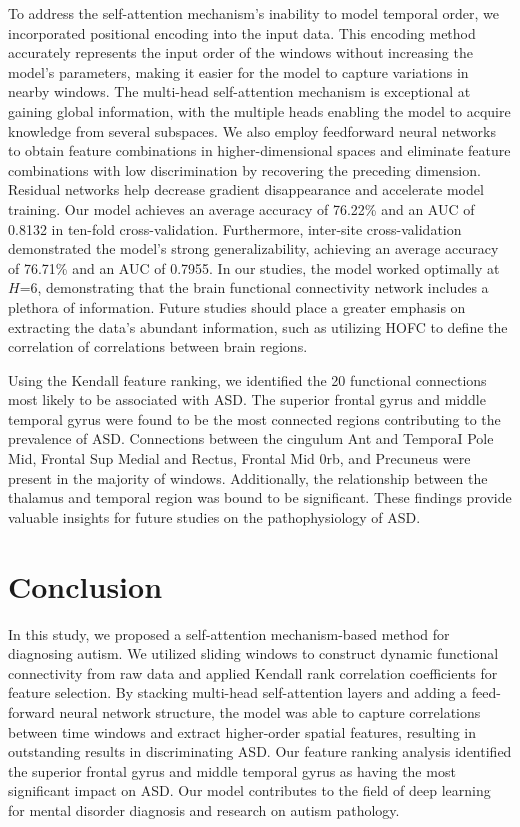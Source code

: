 \documentclass[a4paper]{cas-dc}
\begin{document}
To address the self-attention mechanism's inability to model temporal order, we incorporated positional encoding into the input data. This encoding method accurately represents the input order of the windows without increasing the model's parameters, making it easier for the model to capture variations in nearby windows. The multi-head self-attention mechanism is exceptional at gaining global information, with the multiple heads enabling the model to acquire knowledge from several subspaces. We also employ feedforward neural networks to obtain feature combinations in higher-dimensional spaces and eliminate feature combinations with low discrimination by recovering the preceding dimension. Residual networks help decrease gradient disappearance and accelerate model training. Our model achieves an average accuracy of 76.22\% and an AUC of 0.8132 in ten-fold cross-validation. Furthermore, inter-site cross-validation demonstrated the model's strong generalizability, achieving an average accuracy of 76.71\% and an AUC of 0.7955. In our studies, the model worked optimally at $H$=6, demonstrating that the brain functional connectivity network includes a plethora of information. Future studies should place a greater emphasis on extracting the data's abundant information, such as utilizing HOFC to define the correlation of correlations between brain regions.

Using the Kendall feature ranking, we identified the 20 functional connections most likely to be associated with ASD. The superior frontal gyrus and middle temporal gyrus were found to be the most connected regions contributing to the prevalence of ASD. Connections between the cingulum Ant and TemporaI Pole Mid, Frontal Sup Medial and Rectus, Frontal Mid 0rb, and Precuneus were present in the majority of windows. Additionally, the relationship between the thalamus and temporal region was bound to be significant. These findings provide valuable insights for future studies on the pathophysiology of ASD.
\section{Conclusion}
In this study, we proposed a self-attention mechanism-based method for diagnosing autism. We utilized sliding windows to construct dynamic functional connectivity from raw data and applied Kendall rank correlation coefficients for feature selection. By stacking multi-head self-attention layers and adding a feed-forward neural network structure, the model was able to capture correlations between time windows and extract higher-order spatial features, resulting in outstanding results in discriminating ASD. Our feature ranking analysis identified the superior frontal gyrus and middle temporal gyrus as having the most significant impact on ASD. Our model contributes to the field of deep learning for mental disorder diagnosis and research on autism pathology.

%





\end{document}
